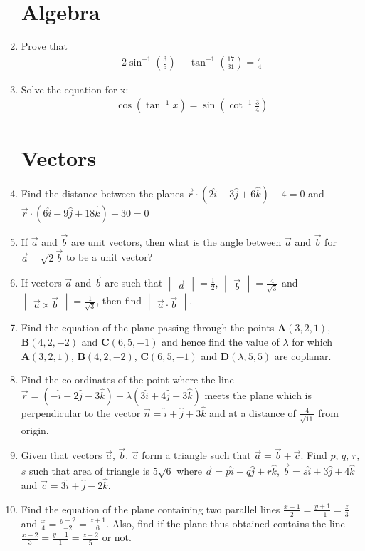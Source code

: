 \documentclass[12pt,-letter paper]{article}
\providecommand{\brak}[1]{\ensuremath{\left(#1\right)}}
\theoremstyle{remark}
\newcommand{\mydet}[1]{\ensuremath{\begin{vmatrix}#1\end{vmatrix}}}
\let\vec\mathbf
\begin{document}
\begin{enumerate}
\section{Algebra}
\item Prove that 
\begin{align*}
2\sin^{-1}\brak{\frac{3}{5}}-\tan^{-1}\brak{\frac{17}{31}} = \frac{\pi}{4}
\end{align*}
\item Solve the equation for x:
\begin{align*}
\cos\brak{\tan^{-1}x} = \sin\brak{\cot^{-1}\frac{3}{4}}
\end{align*}
\section{Vectors}
\item Find the distance between the planes $\overrightarrow{r} \cdot \brak{2\hat{i} - 3\hat{j} + 6\hat{k}} - 4 = 0$ and $\overrightarrow{r} \cdot \brak{6\hat{i} - 9\hat{j} + 18\hat{k}} + 30 = 0$
\item If $\overrightarrow{a}$ and $\overrightarrow{b}$ are unit vectors, then what is the angle between $\overrightarrow{a}$ and $\overrightarrow{b}$ for $\overrightarrow{a} - \sqrt{2}\overrightarrow{b}$ to be a unit vector?
\item If vectors $\overrightarrow{a}$ and $\overrightarrow{b}$ are such that $\mydet{\overrightarrow{a}} = \frac{1}{2}$, $\mydet{\overrightarrow{b}} = \frac{4}{\sqrt{3}}$ and $\mydet{\overrightarrow{a}\times \overrightarrow{b}} = \frac{1}{\sqrt{3}}$, then find $\mydet{\overrightarrow{a} \cdot \overrightarrow{b}}$.
\item Find the equation of the plane passing through the points $\vec{A} \brak{3, 2, 1}$, $\vec{B} \brak{4, 2, -2}$ and $\vec{C} \brak{6, 5, -1}$ and hence find the value of $\lambda$ for which $\vec{A} \brak{3, 2, 1}$, $\vec{B}\brak{4, 2, -2}$, $\vec{C}\brak{6, 5, -1}$ and $\vec{D}\brak{\lambda, 5, 5}$ are coplanar.
\item Find the co-ordinates of the point where the line $\overrightarrow{r} = \brak{-\hat{i}-2\hat{j}-3\hat{k}} + \lambda \brak{3\hat{i}+4\hat{j}+3\hat{k}}$ meets the plane which is perpendicular to the vector $\overrightarrow{n} = \hat{i} + \hat{j} + 3\hat{k}$ and at a distance of $\frac{4}{\sqrt{11}}$ from origin. 
\item Given that vectors $\overrightarrow{a}$, $\overrightarrow{b}$. $\overrightarrow{c}$ form a triangle such that $\overrightarrow{a} = \overrightarrow{b} + \overrightarrow{c}$. Find $p$, $q$, $r$, $s$ such that area of triangle is $5\sqrt{6}$ where $\overrightarrow{a} = p\hat{i} + q\hat{j} + r\hat{k}$, $\overrightarrow{b} = s\hat{i} + 3\hat{j} + 4\hat{k}$ and $\overrightarrow{c} = 3\hat{i} + \hat{j} - 2\hat{k}$.
\item Find the equation of the plane containing two parallel lines $\frac{x-1}{2} = \frac{y+1}{-1} = \frac{z}{3}$ and $\frac{x}{4} = \frac{y-2}{-2} = \frac{z+1}{6}$. Also, find if the plane thus obtained contains the line $\frac{x - 2}{3} = \frac{y - 1}{1} = \frac{z-2}{5}$ or not.

\end{enumerate}
\end{document}
